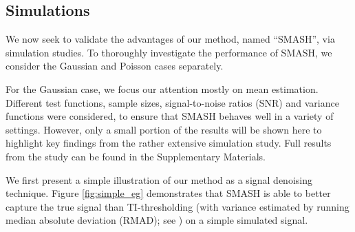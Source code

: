 \documentclass[12pt]{article}
\begin{document}
\subsection{Simulations}
We now seek to validate the advantages of our method, named ``SMASH'', via simulation studies. To thoroughly investigate the performance of SMASH, we consider the Gaussian and Poisson cases separately. 

For the Gaussian case, we focus our attention mostly on mean estimation. Different test functions, sample sizes, signal-to-noise ratios (SNR) and variance functions were considered, to ensure that SMASH behaves well in a variety of settings. However, only a small portion of the results will be shown here to highlight key findings from the rather extensive simulation study. Full results from the study can be found in the Supplementary Materials.

We first present a simple illustration of our method as a signal denoising technique. Figure \ref{fig:simple_eg} demonstrates that SMASH is able to better capture the true signal than TI-thresholding (with variance estimated by running median absolute deviation (RMAD); see \cite{Gao1997Wavelet}) on a simple simulated signal.  
\end{document}
